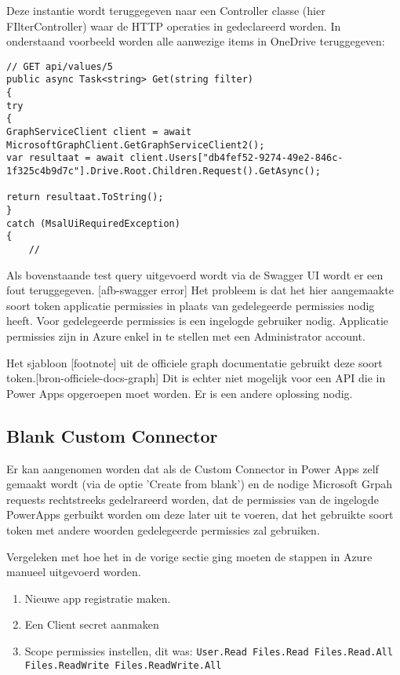 Deze instantie wordt teruggegeven naar een Controller classe (hier FIlterController) waar de HTTP operaties in gedeclareerd worden. In onderstaand voorbeeld worden alle aanwezige items in OneDrive teruggegeven:
\begin{lstlisting}[style=CSharpStyle]
// GET api/values/5
public async Task<string> Get(string filter)
{
try
{
GraphServiceClient client = await MicrosoftGraphClient.GetGraphServiceClient2();
var resultaat = await client.Users["db4fef52-9274-49e2-846c-1f325c4b9d7c"].Drive.Root.Children.Request().GetAsync();

return resultaat.ToString();
}
catch (MsalUiRequiredException)
{
    //
\end{lstlisting}

Als bovenstaande test query uitgevoerd wordt via de Swagger UI wordt er een fout teruggegeven. [afb-swagger error]
Het probleem is dat het hier aangemaakte soort token applicatie permissies in plaats van gedelegeerde permissies nodig heeft. Voor gedelegeerde permissies is een ingelogde gebruiker nodig. Applicatie permissies zijn in Azure enkel in te stellen met een Administrator account.

Het sjabloon [footnote] uit de officiele graph documentatie gebruikt deze soort token.[bron-officiele-docs-graph] Dit is echter niet mogelijk voor een API die in Power Apps opgeroepen moet worden. Er is een andere oplossing nodig.


\subsection{Blank Custom Connector}

Er kan aangenomen worden dat als de Custom Connector in Power Apps zelf gemaakt wordt (via de optie 'Create from blank') en de nodige Microsoft Grpah requests rechtstreeks gedelrareerd worden, dat de permissies van de ingelogde PowerApps gerbuikt worden om deze later uit te voeren, dat het gebruikte soort token met andere woorden gedelegeerde permissies zal gebruiken.

Vergeleken met hoe het in de vorige sectie ging moeten de stappen in Azure manueel uitgevoerd worden.
\begin{enumerate}
    \item Nieuwe app registratie maken.
    \item Een Client secret aanmaken
    \item Scope permissies instellen, dit was: \lstinline|User.Read Files.Read Files.Read.All Files.ReadWrite Files.ReadWrite.All|
\end{enumerate}

